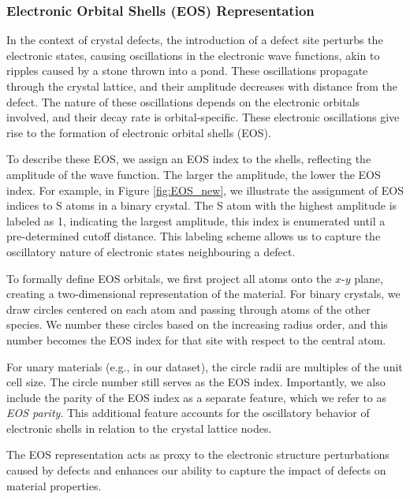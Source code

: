 \subsubsection{Electronic Orbital Shells (EOS) Representation} \label{eos}
    In the context of crystal defects, the introduction of a defect site perturbs the electronic states, causing oscillations in the electronic wave functions, akin to ripples caused by a stone thrown into a pond. These oscillations propagate through the crystal lattice, and their amplitude decreases with distance from the defect. The nature of these oscillations depends on the electronic orbitals involved, and their decay rate is orbital-specific. These electronic oscillations give rise to the formation of electronic orbital shells (EOS).
    
    To describe these EOS, we assign an EOS index to the shells, reflecting the amplitude of the wave function. The larger the amplitude, the lower the EOS index. For example, in Figure \ref{fig:EOS_new}, we illustrate the assignment of EOS indices to S atoms in a binary crystal. The S atom with the highest amplitude is labeled as 1, indicating the largest amplitude, this index is enumerated until a pre-determined cutoff distance. This labeling scheme allows us to capture the oscillatory nature of electronic states neighbouring a defect.
    
    To formally define EOS orbitals, we first project all atoms onto the $x$-$y$ plane, creating a two-dimensional representation of the material. For binary crystals, we draw circles centered on each atom and passing through atoms of the other species. We number these circles based on the increasing radius order, and this number becomes the EOS index for that site with respect to the central atom.
    
    For unary materials (e.g.,  in our dataset), the circle radii are multiples of the unit cell size. The circle number still serves as the EOS index. Importantly, we also include the parity of the EOS index as a separate feature, which we refer to as \textit{EOS parity}. This additional feature accounts for the oscillatory behavior of electronic shells in relation to the crystal lattice nodes.
    
    The EOS representation acts as proxy to the electronic structure perturbations caused by defects and enhances our ability to capture the impact of defects on material properties.
    
